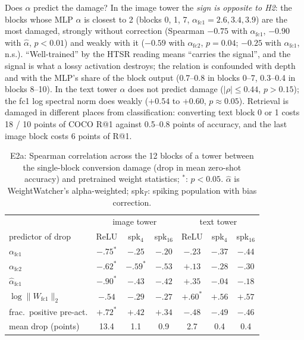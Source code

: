Does $\alpha$ predict the damage? In the image tower the \emph{sign is opposite to H2}: the blocks whose MLP $\alpha$ is closest to 2 (blocks 0, 1, 7, $\alpha_{\mathrm{fc1}}=2.6, 3.4, 3.9$) are the most damaged, strongly without correction (Spearman $-0.75$ with $\alpha_{\mathrm{fc1}}$, $-0.90$ with $\hat\alpha$, $p<0.01$) and weakly with it ($-0.59$ with $\alpha_{\mathrm{fc2}}$, $p=0.04$; $-0.25$ with $\alpha_{\mathrm{fc1}}$, n.s.). ``Well-trained'' by the HTSR reading means ``carries the signal'', and the signal is what a lossy activation destroys; the relation is confounded with depth and with the MLP's share of the block output (0.7--0.8 in blocks 0--7, 0.3--0.4 in blocks 8--10). In the text tower $\alpha$ does not predict damage ($|\rho|\le0.44$, $p>0.15$); the fc1 log spectral norm does weakly ($+0.54$ to $+0.60$, $p\approx0.05$). Retrieval is damaged in different places from classification: converting text block 0 or 1 costs 18 / 10 points of COCO R@1 against 0.5--0.8 points of accuracy, and the last image block costs 6 points of R@1.

\begin{table}[t]
\centering
\small
\begin{tabular}{lcccccc}
\toprule
 & \multicolumn{3}{c}{image tower} & \multicolumn{3}{c}{text tower} \\
predictor of drop & ReLU & spk$_4$ & spk$_{16}$ & ReLU & spk$_4$ & spk$_{16}$ \\
\midrule
$\alpha_{\mathrm{fc1}}$ & $-.75^{*}$ & $-.25$ & $-.20$ & $-.23$ & $-.37$ & $-.44$ \\
$\alpha_{\mathrm{fc2}}$ & $-.62^{*}$ & $-.59^{*}$ & $-.53$ & $+.13$ & $-.28$ & $-.30$ \\
$\hat\alpha_{\mathrm{fc1}}$ & $-.90^{*}$ & $-.43$ & $-.42$ & $+.35$ & $-.04$ & $-.18$ \\
$\log\|W_{\mathrm{fc1}}\|_2$ & $-.54$ & $-.29$ & $-.27$ & $+.60^{*}$ & $+.56$ & $+.57$ \\
frac.\ positive pre-act. & $+.72^{*}$ & $+.42$ & $+.34$ & $-.48$ & $-.49$ & $-.46$ \\
\midrule
mean drop (points) & 13.4 & 1.1 & 0.9 & 2.7 & 0.4 & 0.4 \\
\bottomrule
\end{tabular}
\caption{E2a: Spearman correlation across the 12 blocks of a tower between the single-block conversion damage (drop in mean zero-shot accuracy) and pretrained weight statistics; $^{*}$: $p<0.05$. $\hat\alpha$ is WeightWatcher's alpha-weighted; spk$_T$: spiking population with bias correction.}
\label{tab:e2a}
\end{table}
